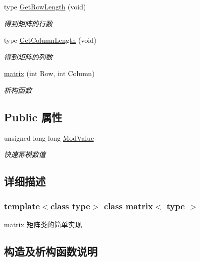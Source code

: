 \begin{DoxyCompactItemize}
$$type \mbox{\hyperlink{classmatrix_a1db0593aa62235f24143913564382990}{Get\+Row\+Length}} (void)
\begin{DoxyCompactList}\small\item\em 得到矩阵的行数 \end{DoxyCompactList}\item 
type \mbox{\hyperlink{classmatrix_aee9fe31d5065ec906cd0ed908cc127a1}{Get\+Column\+Length}} (void)
\begin{DoxyCompactList}\small\item\em 得到矩阵的列数 \end{DoxyCompactList}\item 
\mbox{\hyperlink{classmatrix_a2d0efaa46454804fcf45fae271002cf5}{matrix}} (int Row, int Column)
\begin{DoxyCompactList}\small\item\em 析构函数 \end{DoxyCompactList}\end{DoxyCompactItemize}
\subsection*{Public 属性}
\begin{DoxyCompactItemize}
\item 
\mbox{\label{classmatrix_a047ea31ba5316a00c80d2db118433d6c}} 
unsigned long long \mbox{\hyperlink{classmatrix_a047ea31ba5316a00c80d2db118433d6c}{Mod\+Value}}
\begin{DoxyCompactList}\small\item\em 快速幂模数值 \end{DoxyCompactList}\end{DoxyCompactItemize}


\subsection{详细描述}
\subsubsection*{template$<$class type$>$\newline
class matrix$<$ type $>$}

matrix 矩阵类的简单实现 

\subsection{构造及析构函数说明}
\mbox{\label{classmatrix_a2d0efaa46454804fcf45fae271002cf5}} 
